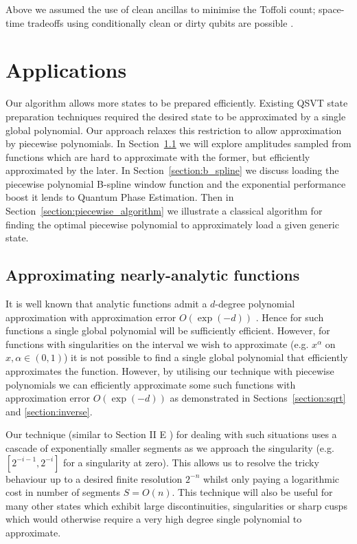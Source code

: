 Above we assumed the use of clean ancillas to minimise the Toffoli count; space-time tradeoffs using conditionally clean or dirty qubits are possible \cite{Khattar:2024pqa, Nie:2024key}.
\section{Applications}
\label{section:applications}
Our algorithm allows more states to be prepared efficiently. Existing QSVT state preparation techniques required the desired state to be approximated by a single global polynomial. Our approach relaxes this restriction to allow approximation by piecewise polynomials. In Section~\ref{section:nearly_analytic} we will explore amplitudes sampled from functions which are hard to approximate with the former, but efficiently approximated by the later. In Section~\ref{section:b_spline} we discuss loading the piecewise polynomial B-spline window function and the exponential performance boost it lends to Quantum Phase Estimation. Then in Section~\ref{section:piecewise_algorithm} we illustrate a classical algorithm for finding the optimal piecewise polynomial to approximately load a given generic state. 

\subsection{Approximating nearly-analytic functions}
\label{section:nearly_analytic}
It is well known that analytic functions admit a $d$-degree polynomial approximation with approximation error $O(\exp(-d))$ \cite{Trefethen}. Hence for such functions a single global polynomial will be sufficiently efficient. However, for functions with singularities on the interval we wish to approximate (e.g. $x^\alpha$ on $x,\alpha\in(0,1)$) it is not possible to find a single global polynomial that efficiently approximates the function. However, by utilising our technique with piecewise polynomials we can efficiently approximate some such functions with approximation error $O\left(\exp(-d)\right)$ as demonstrated in Sections~\ref{section:sqrt} and \ref{section:inverse}.

Our technique (similar to Section II E \cite{Sanders_2020}) for dealing with such situations  uses a cascade of exponentially smaller segments as we approach the singularity (e.g. $[2^{-i-1}, 2^{-i}]$ for a singularity at zero). This allows us to resolve the tricky behaviour up to a desired finite resolution $2^{-n}$ whilst only paying a logarithmic cost in number of segments $S=O(n)$. This technique will also be useful for many other states which exhibit large discontinuities, singularities or sharp cusps which would otherwise require a very high degree single polynomial to approximate.

